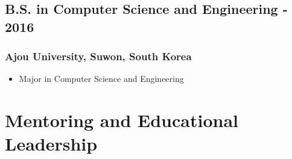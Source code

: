\documentclass[11pt]{article}
\begin{document}
\subsection{B.S. in Computer Science and Engineering\hfill {} - 2016}
\subsubsection{Ajou University, Suwon, South Korea}
\begin{itemize}
    \item[\checkmark] Major in Computer Science and Engineering
\end{itemize}

\section{Mentoring and Educational Leadership}
\end{document}
